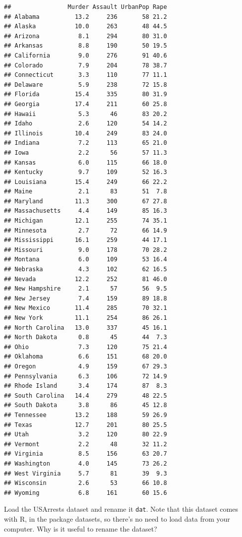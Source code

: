 \documentclass[
]{article}
\begin{document}
\begin{verbatim}
##                Murder Assault UrbanPop Rape
## Alabama          13.2     236       58 21.2
## Alaska           10.0     263       48 44.5
## Arizona           8.1     294       80 31.0
## Arkansas          8.8     190       50 19.5
## California        9.0     276       91 40.6
## Colorado          7.9     204       78 38.7
## Connecticut       3.3     110       77 11.1
## Delaware          5.9     238       72 15.8
## Florida          15.4     335       80 31.9
## Georgia          17.4     211       60 25.8
## Hawaii            5.3      46       83 20.2
## Idaho             2.6     120       54 14.2
## Illinois         10.4     249       83 24.0
## Indiana           7.2     113       65 21.0
## Iowa              2.2      56       57 11.3
## Kansas            6.0     115       66 18.0
## Kentucky          9.7     109       52 16.3
## Louisiana        15.4     249       66 22.2
## Maine             2.1      83       51  7.8
## Maryland         11.3     300       67 27.8
## Massachusetts     4.4     149       85 16.3
## Michigan         12.1     255       74 35.1
## Minnesota         2.7      72       66 14.9
## Mississippi      16.1     259       44 17.1
## Missouri          9.0     178       70 28.2
## Montana           6.0     109       53 16.4
## Nebraska          4.3     102       62 16.5
## Nevada           12.2     252       81 46.0
## New Hampshire     2.1      57       56  9.5
## New Jersey        7.4     159       89 18.8
## New Mexico       11.4     285       70 32.1
## New York         11.1     254       86 26.1
## North Carolina   13.0     337       45 16.1
## North Dakota      0.8      45       44  7.3
## Ohio              7.3     120       75 21.4
## Oklahoma          6.6     151       68 20.0
## Oregon            4.9     159       67 29.3
## Pennsylvania      6.3     106       72 14.9
## Rhode Island      3.4     174       87  8.3
## South Carolina   14.4     279       48 22.5
## South Dakota      3.8      86       45 12.8
## Tennessee        13.2     188       59 26.9
## Texas            12.7     201       80 25.5
## Utah              3.2     120       80 22.9
## Vermont           2.2      48       32 11.2
## Virginia          8.5     156       63 20.7
## Washington        4.0     145       73 26.2
## West Virginia     5.7      81       39  9.3
## Wisconsin         2.6      53       66 10.8
## Wyoming           6.8     161       60 15.6
\end{verbatim}

Load the USArrests dataset and rename it \texttt{dat}. Note that this
dataset comes with R, in the package datasets, so there's no need to
load data from your computer. Why is it useful to rename the dataset?
\end{document}
